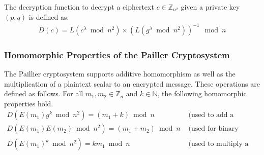 The decryption function to decrypt a ciphertext $c \in \mathbb{Z}_{n^2}$ given a private key $(p,q)$ is defined as:
\begin{align*}
  D(c) = L(c^\lambda \bmod n^2) \times (L(g^\lambda \bmod n^2))^{-1} \mod n
\end{align*}

\subsubsection{Homomorphic Properties of the Pailler Cryptosystem}
The Paillier cryptosystem supports additive homomorphism as well as the multiplication of a plaintext scalar to an encrypted message. These operations are defined as follows.
For all $m_1,m_2 \in \mathbb{Z}_n$ and $k\in \mathbb{N}$, the following homomorphic properties hold.
\begin{align*}
  D(E(m_1)g^k\bmod n^2)=(m_1+k)\bmod n & \text{ (used to add a constant)}\\
  D(E(m_1)E(m_2)\bmod n^2)=(m_1+m_2)\bmod n & \text{ (used for binary addition)}\\
  D(E(m_1)^k\bmod n^2)= km_1\bmod n & \text{ (used to multiply a plaintext constant)}
\end{align*}




